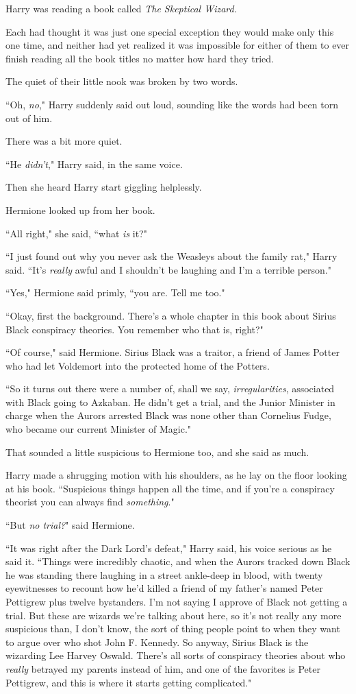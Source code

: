 Harry was reading a book called \emph{The Skeptical Wizard.}

Each had thought it was just one special exception they would make only this one time, and neither had yet realized it was impossible for either of them to ever finish reading all the book titles no matter how hard they tried.

The quiet of their little nook was broken by two words.

``Oh, \emph{no}," Harry suddenly said out loud, sounding like the words had been torn out of him.

There was a bit more quiet.

``He \emph{didn't}," Harry said, in the same voice.

Then she heard Harry start giggling helplessly.

Hermione looked up from her book.

``All right," she said, ``what \emph{is} it?"

``I just found out why you never ask the Weasleys about the family rat," Harry said. ``It's \emph{really} awful and I shouldn't be laughing and I'm a terrible person."

``Yes," Hermione said primly, ``you are. Tell me too."

``Okay, first the background. There's a whole chapter in this book about Sirius Black conspiracy theories. You remember who that is, right?"

``Of course," said Hermione. Sirius Black was a traitor, a friend of James Potter who had let Voldemort into the protected home of the Potters.

``So it turns out there were a number of, shall we say, \emph{irregularities}, associated with Black going to Azkaban. He didn't get a trial, and the Junior Minister in charge when the Aurors arrested Black was none other than Cornelius Fudge, who became our current Minister of Magic."

That sounded a little suspicious to Hermione too, and she said as much.

Harry made a shrugging motion with his shoulders, as he lay on the floor looking at his book. ``Suspicious things happen all the time, and if you're a conspiracy theorist you can always find \emph{something}."

``But \emph{no trial?}" said Hermione.

``It was right after the Dark Lord's defeat," Harry said, his voice serious as he said it. ``Things were incredibly chaotic, and when the Aurors tracked down Black he was standing there laughing in a street ankle-deep in blood, with twenty eyewitnesses to recount how he'd killed a friend of my father's named Peter Pettigrew plus twelve bystanders. I'm not saying I approve of Black not getting a trial. But these are wizards we're talking about here, so it's not really any more suspicious than, I don't know, the sort of thing people point to when they want to argue over who shot John F. Kennedy. So anyway, Sirius Black is the wizarding Lee Harvey Oswald. There's all sorts of conspiracy theories about who \emph{really} betrayed my parents instead of him, and one of the favorites is Peter Pettigrew, and this is where it starts getting complicated."

